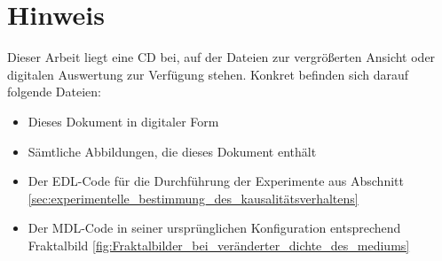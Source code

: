 \section*{Hinweis}

Dieser Arbeit liegt eine CD bei, auf der Dateien zur vergrößerten Ansicht oder digitalen Auswertung zur Verfügung stehen. Konkret befinden sich darauf folgende Dateien:
\begin{itemize}
    \item Dieses Dokument in digitaler Form
    \item Sämtliche Abbildungen, die dieses Dokument enthält
    \item Der EDL-Code für die Durchführung der Experimente aus Abschnitt \ref{sec:experimentelle_bestimmung_des_kausalitätsverhaltens}
    \item Der MDL-Code in seiner ursprünglichen Konfiguration entsprechend Fraktalbild \ref{fig:Fraktalbilder_bei_veränderter_dichte_des_mediums} \pa
\end{itemize}